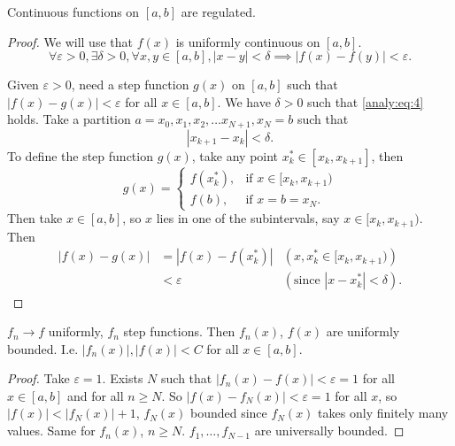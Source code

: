 \begin{theorem}\label{thm:cont_funcs_are_reg}
    Continuous functions on $[a, b]$ are regulated.
\end{theorem}
\begin{proof}
    We will use that $f(x)$ is uniformly continuous on $[a, b]$.
    \begin{equation}\label{analy:eq:4}\tag{*}
        \forall \varepsilon > 0, \exists \delta > 0, \forall x, y \in [a, b], |x - y| < \delta \implies |f(x) - f(y)| < \varepsilon.
    \end{equation}

    Given $\varepsilon > 0$,
    need a step function $g(x)$ on $[a, b]$ such that $|f(x) - g(x)| < \varepsilon$ for all $x \in [a, b]$.
    We have $\delta > 0$ such that \eqref{analy:eq:4} holds.
    Take a partition $a = x_0, x_1, x_2, \dotsc x_{N + 1}, x_N = b$ such that
    \[
    |x_{k + 1} - x_k| < \delta.
    \]
    To define the step function $g(x)$,
    take any point $x_k ^ {*} \in [x_k, x_{k + 1}]$,
    then
    \[
    g(x) = \begin{cases}
        f(x_k ^ {*}), &\text{if } x \in [x_k, x_{k + 1}) \\
        f(b), &\text{if } x = b = x_N.
    \end{cases}
    \]
    Then take $x \in [a, b]$,
    so $x$ lies in one of the subintervals,
    say $x \in [x_k, x_{k + 1})$.
    Then
    \begin{align*}
        |f(x) - g(x)| &= |f(x) - f(x_k ^ {*})| &(\text{$x, x_k ^ {*} \in [x_k, x_{k + 1})$}) \\
        &< \varepsilon &(\text{since $|x - x_k ^ {*}| < \delta$}).
    \end{align*}
\end{proof}

\begin{lemma}\label{lem:uni_conv_imp_bound}
    $f_n \to f$ uniformly,
    $f_n$ step functions.
    Then $f_n(x)$,
    $f(x)$ are uniformly bounded.
    I.e. $|f_n(x)|, |f(x)| < C$ for all $x \in [a, b]$.
\end{lemma}
\begin{proof}
    Take $\varepsilon = 1$.
    Exists $N$ such that $|f_n(x) - f(x)| < \varepsilon = 1$ for all $x \in [a, b]$ and for all $n \geq N$.
    So $|f(x) - f_N(x)| < \varepsilon = 1$ for all $x$,
    so $|f(x)| < |f_N(x)| + 1$,
    $f_N(x)$ bounded since $f_N(x)$ takes only finitely many values.
    Same for $f_n(x)$,
    $n \geq N$.
    $f_1, \dotsc, f_{N - 1}$ are universally bounded.
\end{proof}

